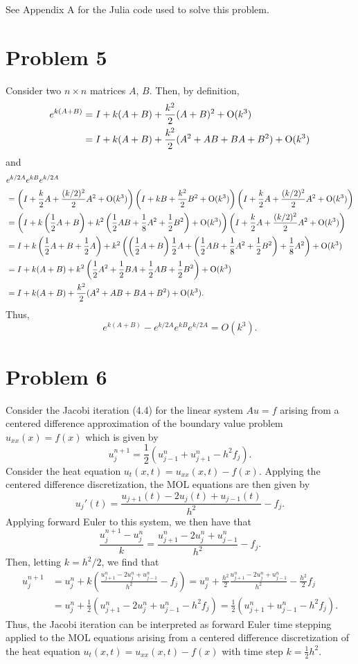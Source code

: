 \documentclass{article}
\begin{document}
See Appendix A for the Julia code used to solve this problem. 

\section{Problem 5}
Consider two $n \times n$ matrices $A$, $B$. Then, by definition, 
\begin{align*}
e^{k(A+B)}&=I+k(A+B)+\frac{k^2}{2}(A+B)^2+\operatorname{O}(k^3)\\&=
I+k(A+B)+\frac{k^2}{2}(A^2+AB+BA+B^2)+\operatorname{O}(k^3)
\end{align*}
and 
\begin{align*}
&e^{k/2 A}e^{k B}e^{k/2 A}\\&=
\left(I+\frac{k}{2}A+\frac{(k/2)^2}{2}A^2+\operatorname{O}(k^3)\right)\left(I+kB+\frac{k^2}{2}B^2+\operatorname{O}(k^3)\right)\left(I+\frac{k}{2}A+\frac{(k/2)^2}{2}A^2+\operatorname{O}(k^3)\right)\\&=
\left(I+k\left(\frac{1}{2}A+B\right)+k^2\left(\frac{1}{2}AB+\frac{1}{8}A^2+\frac{1}{2}B^2\right)+\operatorname{O}(k^3)\right)\left(I+\frac{k}{2}A+\frac{(k/2)^2}{2}A^2+\operatorname{O}(k^3)\right)\\&=
I+k\left(\frac{1}{2}A+B+\frac{1}{2}A\right)+k^2\left(\left(\frac{1}{2}A+B\right)\frac{1}{2}A+\left(\frac{1}{2}AB+\frac{1}{8}A^2+\frac{1}{2}B^2\right)+\frac{1}{8}A^2\right)+\operatorname{O}(k^3)\\&=
I+k(A+B)+k^2\left(\frac{1}{2}A^2+\frac{1}{2}BA+\frac{1}{2}AB+\frac{1}{2}B^2\right)+\operatorname{O}(k^3)\\&=
I+k(A+B)+\frac{k^2}{2}(A^2+AB+BA+B^2)+\operatorname{O}(k^3).
\end{align*}
Thus,
\[
e^{k(A+B)} - e^{k/2 A}e^{k B}e^{k/2 A} = O(k^3).
\]

\section{Problem 6}
Consider the Jacobi iteration (4.4) for the linear system $A u=f$ arising from a centered difference approximation of the boundary value problem $u_{x x}(x)=f(x)$ which is given by
\[
u_j^{n+1}=\frac{1}{2}(u^n_{j-1}+u_{j+1}^n-h^2f_j).
\]
Consider the heat equation $u_{t}(x, t)=u_{x x}(x, t)-f(x)$. Applying the centered difference discretization, the MOL equations are then given by
\[
u_j'(t)=\frac{u_{j+1}(t)-2u_j(t)+u_{j-1}(t)}{h^2}-f_j.
\] 
Applying forward Euler to this system, we then have that 
\[
\frac{u_j^{n+1}-u_j^n}{k}=\frac{u_{j+1}^n-2u_j^n+u_{j-1}^n}{h^2}-f_j.
\]
Then, letting $k=h^2/2$, we find that 
\begin{align*}
u_j^{n+1}&=u_j^n+k\left(\frac{u_{j+1}^n-2u_j^n+u_{j-1}^n}{h^2}-f_j\right)=u_j^n+\frac{h^2}{2}\frac{u_{j+1}^n-2u_j^n+u_{j-1}^n}{h^2}-\frac{h^2}{2}f_j\\&=
u_j^n+\frac{1}{2}(u_{j+1}^n-2u_j^n+u_{j-1}^n-h^2f_j)=\frac{1}{2}(u_{j+1}^n+u_{j-1}^n-h^2f_j).
\end{align*}
Thus, the Jacobi iteration can be interpreted as forward Euler time stepping applied to the MOL equations arising from a centered difference discretization of the heat equation $u_{t}(x, t)=u_{x x}(x, t)-f(x)$ with time step $k=\frac{1}{2} h^{2}$.
\end{document}

